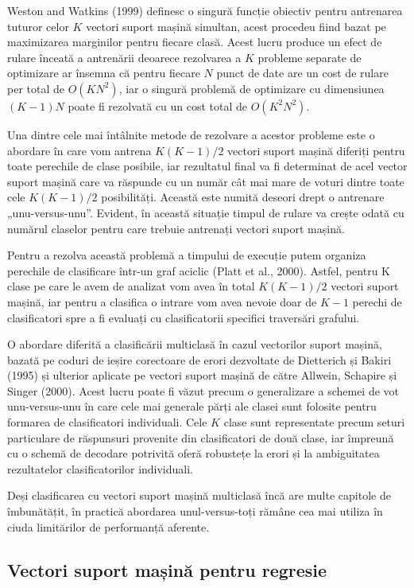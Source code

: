 Weston and Watkins (1999) definesc o singură funcție obiectiv pentru antrenarea tuturor celor $K$ vectori suport mașină simultan, acest procedeu fiind bazat pe maximizarea marginilor pentru fiecare clasă. Acest lucru produce un efect de rulare înceată a antrenării deoarece rezolvarea a $K$ probleme separate de optimizare ar însemna că pentru fiecare $N$ punct de date are un cost de rulare per total de $O(KN^2)$, iar o singură problemă de optimizare cu dimensiunea $(K - 1)N$ poate fi rezolvată cu un cost total de $O(K^2N^2)$.

Una dintre cele mai întâlnite metode de rezolvare a acestor probleme este o abordare în care vom antrena $K(K-1)/2$ vectori suport mașină diferiți pentru toate perechile de clase posibile, iar rezultatul final va fi determinat de acel vector suport mașină care va răspunde cu un număr cât mai mare de voturi dintre toate cele $K(K-1)/2$ posibilități. Această este numită deseori drept o antrenare „unu-versus-unu”. Evident, în această situație timpul de rulare va crește odată cu numărul claselor pentru care trebuie antrenați vectori suport mașină.

Pentru a rezolva această problemă a timpului de execuție putem organiza perechile de clasificare într-un graf aciclic (Platt et al., 2000). Astfel, pentru K clase pe care le avem de analizat vom avea în total $K(K-1)/2$ vectori suport mașină, iar pentru a clasifica o intrare vom avea nevoie doar de $K-1$ perechi de clasificatori spre a fi evaluați cu clasificatorii specifici traversări grafului.

O abordare diferită a clasificării multiclasă în cazul vectorilor suport mașină, bazată pe coduri de ieșire corectoare de erori dezvoltate de Dietterich și Bakiri (1995) și ulterior aplicate pe vectori suport mașină de către Allwein, Schapire și Singer (2000). 
Acest lucru poate fi văzut precum o generalizare a schemei de vot unu-versus-unu în care cele mai generale părți ale clasei sunt folosite pentru formarea de clasificatori individuali.
Cele $K$ clase sunt representate precum seturi particulare de răspunsuri provenite din clasificatori de două clase, iar împreună cu o schemă de decodare potrivită oferă robustețe la erori și la ambiguitatea rezultatelor clasificatorilor individuali.

Deși clasificarea cu vectori suport mașină multiclasă încă are multe capitole de îmbunătățit, în practică abordarea unul-versus-toți rămâne cea mai utiliza în ciuda limitărilor de performanță aferente.

\subsection{Vectori suport mașină pentru regresie}

